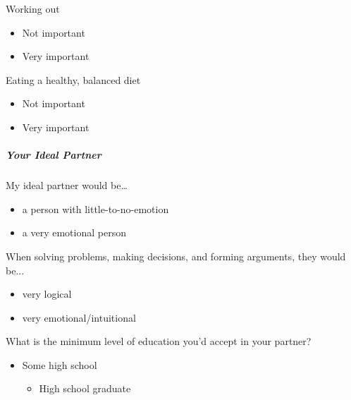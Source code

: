 \documentclass[twoside]{report}
\begin{document}
\begin{multicols*}{2}
\begin{multicols}{2}
Working out

\begin{itemize}
\item
  Not important
\end{itemize}

\begin{itemize}
\item
  Very important
\end{itemize}

Eating a healthy, balanced diet

\begin{itemize}
\item
  Not important
\end{itemize}

\begin{itemize}
\item
  Very important
\end{itemize}

\subparagraph{Your Ideal Partner}

My ideal partner would be\ldots{}

\begin{itemize}
\item
  a person with little-to-no-emotion
\end{itemize}

\begin{itemize}
\item
  a very emotional person
\end{itemize}

When solving problems, making decisions, and forming arguments, they
would be...

\begin{itemize}
\item
  very logical
\end{itemize}

\begin{itemize}
\item
  very emotional/intuitional
\end{itemize}

What is the minimum level of education you'd accept in your partner?

\begin{itemize}
\item
  Some high school

  \begin{itemize}
  \item
    High school graduate
  \end{itemize}


\end{itemize}
\end{multicols}
\end{multicols*}
\end{document}
